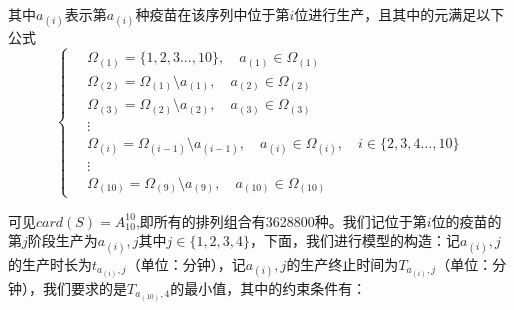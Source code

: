 \documentclass{ctexart}
\begin{document}
其中$a_{(i)}$表示第$a_{(i)}$种疫苗在该序列中位于第$i$位进行生产，且其中的元满足以下公式
\begin{equation}
    \begin{cases}
        \quad \Omega_{(1)} = \{ 1 , 2 , 3 ... , 10 \} ,\quad a_{(1)} \in \Omega_{(1)} \\
        \quad \Omega_{(2)} = \Omega_{(1)} \setminus a_{(1)} , \quad a_{(2)} \in \Omega_{(2)}\\ 
        \quad \Omega_{(3)} = \Omega_{(2)} \setminus a_{(2)} , \quad a_{(3)} \in \Omega_{(3)}\\
        \quad \vdots \\
        \quad \Omega_{(i)} = \Omega_{(i-1)} \setminus a_{(i-1)} , \quad a_{(i)} \in \Omega_{(i)},\quad i \in \{ 2 , 3 , 4 ... , 10 \} \\
        \quad \vdots\\
        \quad \Omega_{(10)} = \Omega_{(9)} \setminus a_{(9)} , \quad a_{(10)} \in \Omega_{(10)}\nonumber 
        \label{solve}
     \end{cases}
\end{equation}

可见$card(S)=A_{10}^{10}$,即所有的排列组合有3628800种。我们记位于第$i$位的疫苗的第$j$阶段生产为$a_{(i)},j$其中$j \in \{1,2,3,4\}$，下面，我们进行模型的构造：记$a_{(i)},j$的生产时长为$t_{a_{(i)},j}$（单位：分钟），记$a_{(i)},j$的生产终止时间为$T_{a_{(i)},j}$（单位：分钟），我们要求的是$T_{a_{(10)},4}$的最小值，其中的约束条件有：
\end{document}
